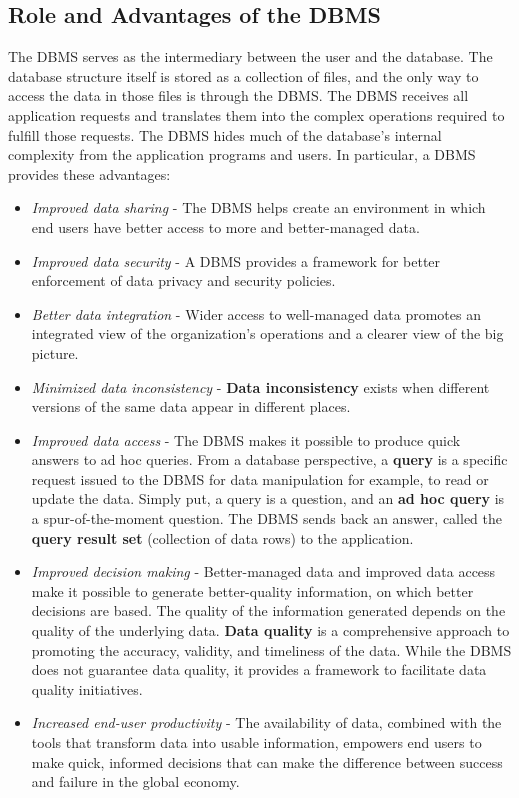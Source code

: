 \documentclass[a4paper, 12pt, titlepage]{report}
\begin{document}
\subsection{Role and Advantages of the DBMS}
The DBMS serves as the intermediary between the user and the database. The database structure itself is stored as a collection of files, and the only way to access the data in those files is through the DBMS. The DBMS receives all application requests and translates them into the complex operations required to fulfill those requests. The DBMS hides much of the database’s internal complexity from the application programs and users.
\noindent In particular, a DBMS provides these advantages:
\begin{itemize}
\item \emph{Improved data sharing} - The DBMS helps create an environment in which end users have better access to more and better-managed data.
\item \emph{Improved data security} - A DBMS provides a framework for better enforcement of data privacy and security policies.
\item \emph{Better data integration} - Wider access to well-managed data promotes an integrated view of the organization’s operations and a clearer view of the big picture.
\item \emph{Minimized data inconsistency} - \textbf{Data inconsistency} exists when different versions of the same data appear in different places.
\item \emph{Improved data access} - The DBMS makes it possible to produce quick answers to ad hoc queries. From a database perspective, a \textbf{query} is a specific request issued to the DBMS for data manipulation for example, to read or update the data. Simply put, a query is a question, and an \textbf{ad hoc query} is a spur-of-the-moment question. The DBMS sends back an answer, called the \textbf{query result set} (collection of data rows) to the application.
\item \emph{Improved decision making} - Better-managed data and improved data access make it possible to generate better-quality information, on which better decisions are based. The quality of the information generated depends on the quality of the underlying data. \textbf{Data quality} is a comprehensive approach to promoting the accuracy, validity, and timeliness of the data. While the DBMS does not guarantee data quality, it provides a framework to facilitate data quality initiatives.
\item \emph{Increased end-user productivity} - The availability of data, combined with the tools that transform data into usable information, empowers end users to make quick, informed decisions that can make the difference between success and failure in the global economy.
\end{itemize}
\end{document}
